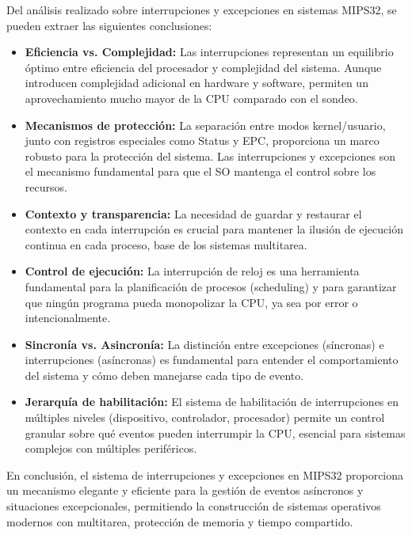\documentclass[12pt]{article}
\begin{document}
Del análisis realizado sobre interrupciones y excepciones en sistemas MIPS32, se pueden extraer las siguientes conclusiones:

\begin{itemize}
	\item \textbf{Eficiencia vs. Complejidad:} Las interrupciones representan un equilibrio óptimo entre eficiencia del procesador y complejidad del sistema. Aunque introducen complejidad adicional en hardware y software, permiten un aprovechamiento mucho mayor de la CPU comparado con el sondeo.
	
	\item \textbf{Mecanismos de protección:} La separación entre modos kernel/usuario, junto con registros especiales como Status y EPC, proporciona un marco robusto para la protección del sistema. Las interrupciones y excepciones son el mecanismo fundamental para que el SO mantenga el control sobre los recursos.
	
	\item \textbf{Contexto y transparencia:} La necesidad de guardar y restaurar el contexto en cada interrupción es crucial para mantener la ilusión de ejecución continua en cada proceso, base de los sistemas multitarea.
	
	\item \textbf{Control de ejecución:} La interrupción de reloj es una herramienta fundamental para la planificación de procesos (scheduling) y para garantizar que ningún programa pueda monopolizar la CPU, ya sea por error o intencionalmente.
	
	\item \textbf{Sincronía vs. Asincronía:} La distinción entre excepciones (síncronas) e interrupciones (asíncronas) es fundamental para entender el comportamiento del sistema y cómo deben manejarse cada tipo de evento.
	
	\item \textbf{Jerarquía de habilitación:} El sistema de habilitación de interrupciones en múltiples niveles (dispositivo, controlador, procesador) permite un control granular sobre qué eventos pueden interrumpir la CPU, esencial para sistemas complejos con múltiples periféricos.
\end{itemize}

En conclusión, el sistema de interrupciones y excepciones en MIPS32 proporciona un mecanismo elegante y eficiente para la gestión de eventos asíncronos y situaciones excepcionales, permitiendo la construcción de sistemas operativos modernos con multitarea, protección de memoria y tiempo compartido.
\end{document}
